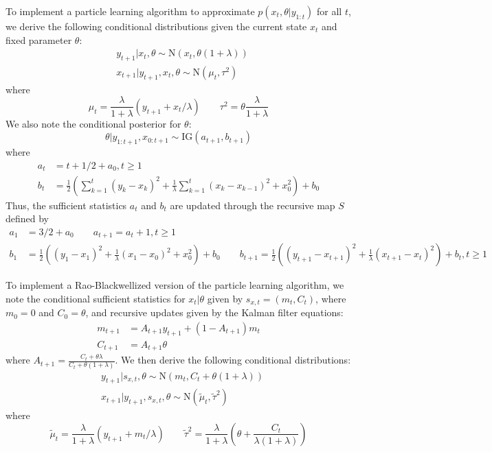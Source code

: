 \documentclass{article}
\begin{document}
To implement a particle learning algorithm to approximate $p(x_t,\theta|y_{1:t})$ for all $t$, we derive the following conditional distributions given the current state $x_t$ and fixed parameter $\theta$:
\begin{align*}
&y_{t+1}|x_t,\theta \sim \mbox{N}\left(x_t,\theta(1+\lambda)\right) \\
&x_{t+1}|y_{t+1},x_t,\theta \sim \mbox{N}(\mu_t,\tau^2)
\end{align*}
where \[\mu_t = \frac{\lambda}{1+\lambda}(y_{t+1} + x_t / \lambda) \qquad \tau^2 = \theta\frac{\lambda}{1+\lambda}\]
\noindent We also note the conditional posterior for $\theta$:
\begin{equation}
\theta|y_{1:t+1},x_{0:t+1} \sim \mbox{IG}(a_{t+1},b_{t+1})
\end{equation}
where
\begin{align*}
a_t &= t + 1/2 + a_0, t \ge 1 \\
b_t &= \frac{1}{2}\left(\sum_{k=1}^t (y_k - x_k)^2 + \frac{1}{\lambda}\sum_{k=1}^t (x_k - x_{k-1})^2 + x_0^2\right) + b_0
\end{align*}
Thus, the sufficient statistics $a_t$ and $b_t$ are updated through the recursive map $S$ defined by
\begin{align*}
a_1 &= 3/2 + a_0 \qquad a_{t+1} = a_t + 1, t \ge 1 \\
b_1 &= \frac{1}{2}\left((y_1-x_1)^2 + \frac{1}{\lambda}(x_1-x_0)^2 + x_0^2\right) + b_0 \qquad b_{t+1} = \frac{1}{2}\left((y_{t+1}-x_{t+1})^2 + \frac{1}{\lambda}(x_{t+1}-x_t)^2\right) + b_t, t \ge 1
\end{align*}

To implement a Rao-Blackwellized version of the particle learning algorithm, we note the conditional sufficient statistics for $x_t|\theta$ given by $s_{x,t} = (m_t, C_t)$, where $m_0 = 0$ and $C_0 = \theta$, and recursive updates given by the Kalman filter equations:
\begin{align*}
m_{t+1} &= A_{t+1}y_{t+1} + (1-A_{t+1})m_t \\
C_{t+1} &= A_{t+1}\theta
\end{align*}
where $A_{t+1} = \frac{C_t + \theta\lambda}{C_t + \theta(1+\lambda)}$. We then derive the following conditional distributions:
\begin{align*}
&y_{t+1}|s_{x,t},\theta \sim \mbox{N}\left(m_t, C_t + \theta(1+\lambda)\right) \\
&x_{t+1}|y_{t+1},s_{x,t},\theta \sim \mbox{N}(\tilde{\mu}_t,\tilde{\tau}^2)
\end{align*}
where \[\tilde{\mu}_t = \frac{\lambda}{1+\lambda}(y_{t+1} + m_t / \lambda) \qquad \tilde{\tau}^2 = \frac{\lambda}{1+\lambda}\left(\theta + \frac{C_t}{\lambda(1+\lambda)}\right)\]
\end{document}
